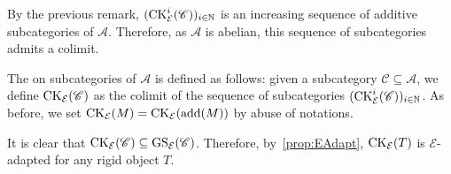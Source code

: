 By the previous remark, $(\mathrm{CK}_{\mathcal{E}}^i(\mathscr{C}))_{i\in \mathbb{N}}$ is an increasing sequence of additive subcategories of $\mathscr{A}$. Therefore, as $\mathscr{A}$ is abelian, this sequence of subcategories admits a colimit.

\begin{definition} \label{def:CKop}
    The  on subcategories of $\mathscr{A}$ is defined as follows: given a subcategory $\mathscr{C} \subseteq \mathscr{A}$, we define $\mathrm{CK}_{\mathcal{E}}(\mathscr{C})$ as the colimit of the sequence of subcategories $(\mathrm{CK}_\mathcal{E}^i(\mathscr{C}))_{i\in \mathbb{N}}$. As before, we set $\mathrm{CK}_\mathcal{E}(M) = \mathrm{CK}_\mathcal{E}(\operatorname{add}(M))$ by abuse of notations.
\end{definition}

\begin{remark}
It is clear that $\mathrm{CK}_{\mathcal{E}}(\mathscr{C}) \subseteq \operatorname{GS}_{\mathcal{E}}(\mathscr{C})$. Therefore, by~\cref{prop:EAdapt}, $\mathrm{CK}_{\mathcal{E}}(T)$ is $\mathcal{E}$-adapted for any rigid object $T$.

\end{remark}

